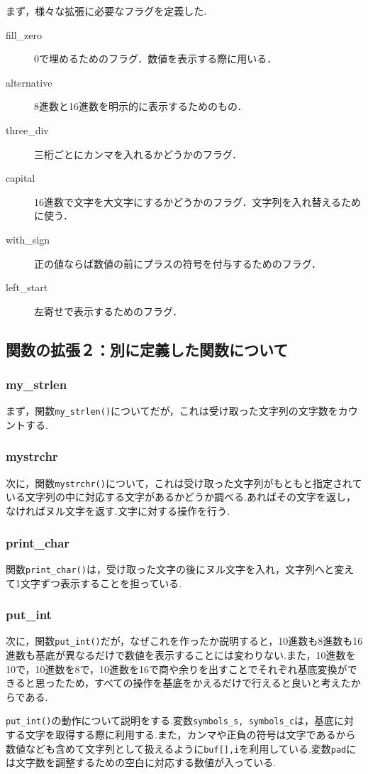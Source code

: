 \documentclass[a4j,11pt]{jarticle}
\begin{document}
まず，様々な拡張に必要なフラグを定義した.
\begin{description}
  \item[fill\_zero]0で埋めるためのフラグ．数値を表示する際に用いる．
  \item[alternative]8進数と16進数を明示的に表示するためのもの．
  \item[three\_div]三桁ごとにカンマを入れるかどうかのフラグ．
  \item[capital]16進数で文字を大文字にするかどうかのフラグ．文字列を入れ替えるために使う．
  \item[with\_sign]正の値ならば数値の前にプラスの符号を付与するためのフラグ．
  \item[left\_start]左寄せで表示するためのフラグ．
\end{description}
\subsection{関数の拡張２：別に定義した関数について}
\subsubsection{my\_strlen}
まず，関数\verb|my_strlen()|についてだが，これは受け取った文字列の文字数をカウントする.
\subsubsection{mystrchr}
次に，関数\verb|mystrchr()|について，これは受け取った文字列がもともと指定されている文字列の中に対応する文字があるかどうか調べる.あればその文字を返し，なければヌル文字を返す.文字に対する操作を行う.
\subsubsection{print\_char}
関数\verb|print_char()|は，受け取った文字の後にヌル文字を入れ，文字列へと変えて1文字ずつ表示することを担っている.
\subsubsection{put\_int}
次に，関数\verb|put_int()|だが，なぜこれを作ったか説明すると，10進数も8進数も16進数も基底が異なるだけで数値を表示することには変わりない.また，10進数を10で，10進数を8で，10進数を16で商や余りを出すことでそれぞれ基底変換ができると思ったため，すべての操作を基底をかえるだけで行えると良いと考えたからである.

\verb|put_int()|の動作について説明をする.変数\verb|symbols_s, symbols_c|は，基底に対する文字を取得する際に利用する.また，カンマや正負の符号は文字であるから数値なども含めて文字列として扱えるように\verb|buf[],i|を利用している.変数\verb|pad|には文字数を調整するための空白に対応する数値が入っている.
\end{document}
